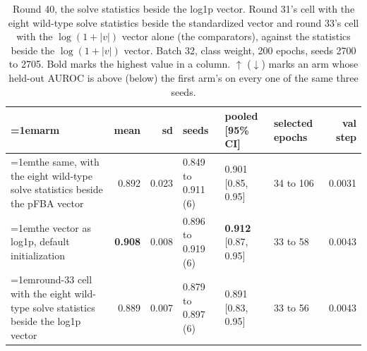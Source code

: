 \begin{table}[H]
  \centering
  \scriptsize
  \setlength{\tabcolsep}{2.5pt}
  \caption[Round 40, the solve statistics beside the log1p vector]{Round 40, the solve statistics beside the log1p vector. Round 31's cell with the eight wild-type solve statistics beside the standardized vector and round 33's cell with the $\log(1 + |v|)$ vector alone (the comparators), against the statistics beside the $\log(1 + |v|)$ vector. Batch 32, class weight, 200 epochs, seeds 2700 to 2705. Bold marks the highest value in a column. $\uparrow$ ($\downarrow$) marks an arm whose held-out AUROC is above (below) the first arm's on every one of the same three seeds.}
  \label{tab:w56}
  \begin{tabular}{@{}>{\raggedright\hangindent=1em\hangafter=1\arraybackslash}p{84.4mm}rrlllr@{}}
    \hline
    arm & mean & sd & seeds & pooled [95\% CI] & selected epochs & val step \\
    \hline
    the same, with the eight wild-type solve statistics beside the pFBA vector & 0.892 & 0.023 & 0.849 to 0.911 (6) & 0.901 [0.85, 0.95] & 34 to 106 & 0.0031 \\
    the vector as log1p, default initialization & \textbf{0.908} & 0.008 & 0.896 to 0.919 (6) & \textbf{0.912} [0.87, 0.95] & 33 to 58 & 0.0043 \\
    round-33 cell with the eight wild-type solve statistics beside the log1p vector & 0.889 & 0.007 & 0.879 to 0.897 (6) & 0.891 [0.83, 0.95] & 33 to 56 & 0.0043 \\
    \hline
  \end{tabular}
\end{table}
